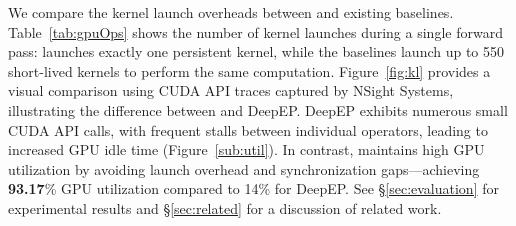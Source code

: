 We compare the kernel launch overheads between \sysname and existing baselines.
Table~\ref{tab:gpuOps} shows the number of kernel launches during a single forward pass: \sysname launches exactly one persistent kernel, while the baselines launch up to 550 short-lived kernels to perform the same computation.
Figure~\ref{fig:kl} provides a visual comparison using CUDA API traces captured by NSight Systems, illustrating the difference between \sysname and DeepEP.
DeepEP exhibits numerous small CUDA API calls, with frequent stalls between individual operators, leading to increased GPU idle time (Figure~\ref{sub:util}).
In contrast, \sysname maintains high GPU utilization by avoiding launch overhead and synchronization gaps—achieving \textbf{93.17}\% GPU utilization compared to 14\% for DeepEP.
See \S\ref{sec:evaluation} for experimental results and \S\ref{sec:related} for a discussion of related work.